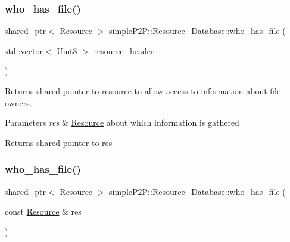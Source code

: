 \subsubsection{\texorpdfstring{who\+\_\+has\+\_\+file()}{who\_has\_file()}\hspace{0.1cm}{\footnotesize\ttfamily [1/2]}}
{\footnotesize\ttfamily shared\+\_\+ptr$<$ \hyperlink{classsimpleP2P_1_1Resource}{Resource} $>$ simple\+P2\+P\+::\+Resource\+\_\+\+Database\+::who\+\_\+has\+\_\+file (\begin{DoxyParamCaption}\item[{std\+::vector$<$ Uint8 $>$}]{resource\+\_\+header }\end{DoxyParamCaption})\hspace{0.3cm}{\ttfamily [inline]}}



Returns shared pointer to resource to allow access to information about file owners. 


\begin{DoxyParams}{Parameters}
{\em res} & \hyperlink{classsimpleP2P_1_1Resource}{Resource} about which information is gathered \\
\hline
\end{DoxyParams}
\begin{DoxyReturn}{Returns}
shared pointer to res 
\end{DoxyReturn}
\mbox{\label{classsimpleP2P_1_1Resource__Database_a70aa9503db5700a6abdfdc9b029d71c1}} 
\subsubsection{\texorpdfstring{who\+\_\+has\+\_\+file()}{who\_has\_file()}\hspace{0.1cm}{\footnotesize\ttfamily [2/2]}}
{\footnotesize\ttfamily shared\+\_\+ptr$<$ \hyperlink{classsimpleP2P_1_1Resource}{Resource} $>$ simple\+P2\+P\+::\+Resource\+\_\+\+Database\+::who\+\_\+has\+\_\+file (\begin{DoxyParamCaption}\item[{const \hyperlink{classsimpleP2P_1_1Resource}{Resource} \&}]{res }\end{DoxyParamCaption})}



